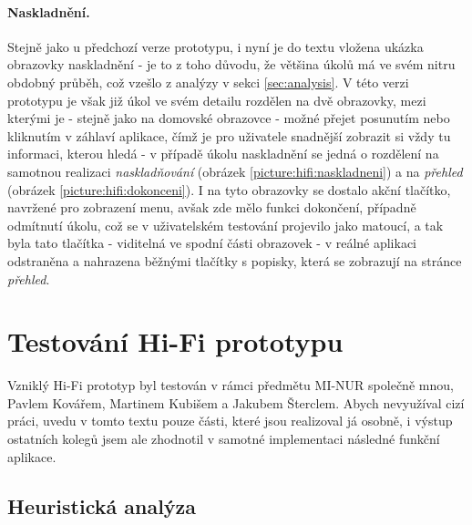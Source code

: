 \paragraph{Naskladnění.} Stejně jako u předchozí verze prototypu, i nyní je do textu vložena ukázka obrazovky naskladnění - je to z toho důvodu, že většina úkolů má ve svém nitru obdobný průběh, což vzešlo z analýzy v sekci \ref{sec:analysis}. V této verzi prototypu je však již úkol ve svém detailu rozdělen na dvě obrazovky, mezi kterými je - stejně jako na domovské obrazovce - možné přejet posunutím nebo kliknutím v záhlaví aplikace, čímž je pro uživatele snadnější zobrazit si vždy tu informaci, kterou hledá - v případě úkolu naskladnění se jedná o rozdělení na samotnou realizaci \emph{naskladňování} (obrázek \ref{picture:hifi:naskladneni}) a na \emph{přehled} (obrázek \ref{picture:hifi:dokonceni}). I na tyto obrazovky se dostalo akční tlačítko, navržené pro zobrazení menu, avšak zde mělo funkci dokončení, případně odmítnutí úkolu, což se v uživatelském testování projevilo jako matoucí, a tak byla tato tlačítka - viditelná ve spodní části obrazovek - v reálné aplikaci odstraněna a nahrazena běžnými tlačítky s popisky, která se zobrazují na stránce \emph{přehled}.


\section{Testování Hi-Fi prototypu}

Vzniklý Hi-Fi prototyp byl testován v rámci předmětu MI-NUR společně mnou, Pavlem Kovářem, Martinem Kubišem a Jakubem Šterclem. Abych nevyužíval cizí práci, uvedu v tomto textu pouze části, které jsou realizoval já osobně, i výstup ostatních kolegů jsem ale zhodnotil v samotné implementaci následné funkční aplikace.


\subsection{Heuristická analýza}

